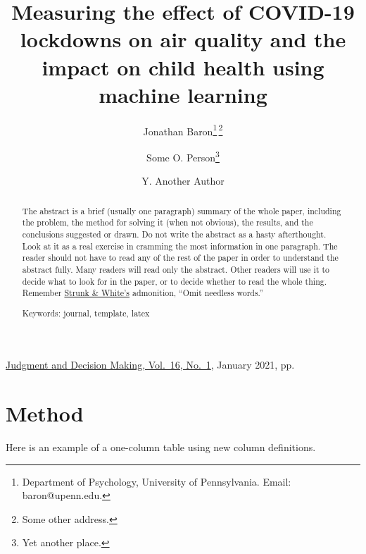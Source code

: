 \documentclass[12pt]{article}
\title{Measuring the effect of COVID-19 lockdowns on air quality and the impact on child health using machine learning}
\author{
Jonathan Baron\thanks{Department of Psychology, University of
  Pennsylvania. Email: baron@upenn.edu.}\;\,\thanks{Some other address.}
\and 
  Some O. Person\thanks{Yet another place.} 
\and
  Y. Another Author\footnotemark[2] %
}
\date{} %
\newcommand{\jref}{http://journal.sjdm.org/vol16.1.html}
\newcommand{\jhead}{Judgment and Decision Making, Vol.~16, No.~1}
\newcommand{\jdate}{January 2021}
\begin{document}

\begin{htmlonly}
\href{\jref}{\jhead}, \jdate, pp.\
\end{htmlonly}

\maketitle

\begin{abstract}

The abstract is a brief (usually one paragraph) summary
of the whole paper, including the problem, the method for solving
it (when not obvious), the results, and the conclusions suggested
or drawn.  Do not write the abstract as a hasty
afterthought. Look at it as a real exercise in cramming the most
information in one paragraph.  The reader should not have to read
any of the rest of the paper in order to understand the abstract
fully.  Many readers will read only the abstract.  Other readers
will use it to decide what to look for in the paper, or to decide
whether to read the whole thing.  Remember 
\href{http://en.wikipedia.org/wiki/The_Elements_of_Style}{Strunk \&
  White's} admonition, ``Omit needless words.''

\smallskip
\noindent
Keywords: journal, template, latex
\end{abstract}

{\renewcommand{\thefootnote}{}
}

\saythanks

\setlength{\baselineskip}{16pt plus.2pt}



\section{Method} %

Here is an example of a one-column table using new column definitions.
\end{document}

